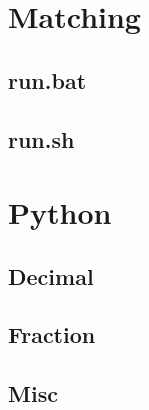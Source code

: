 \documentclass[a4paper,10pt,twocolumn,oneside]{article}
\begin{document}
\section{Matching}

\subsection{run.bat}


\subsection{run.sh}


\section{Python}

\subsection{Decimal}


\subsection{Fraction}


\subsection{Misc}


% 

% 

% 
\end{document}

